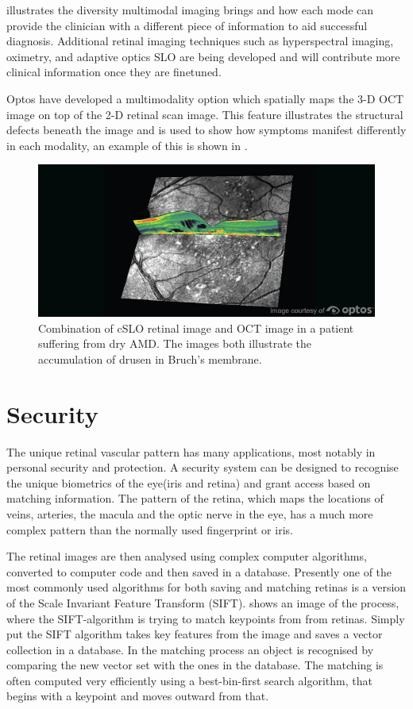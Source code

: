  illustrates the diversity multimodal imaging brings and how each mode
can provide the clinician with a different piece of information to aid successful
diagnosis. Additional retinal imaging techniques such as hyperspectral imaging,
oximetry, and adaptive optics SLO are being developed and will contribute more
clinical information once they are finetuned.

Optos have developed a multimodality option which spatially maps the 3-D OCT
image on top of the 2-D retinal scan image. This feature illustrates the structural
defects beneath the image and is used to show how symptoms manifest differently in
each modality, an example of this is shown in .

\begin{figure}[htbp]
\centering
 \includegraphics{figures/multi}
\caption{Combination of cSLO retinal image and OCT image in a patient suffering from
dry AMD. The images both illustrate the accumulation of drusen in Bruch’s membrane.}
\label{fig:multi}
\end{figure}

\section{Security}


The unique retinal vascular pattern has many applications, most notably in personal
security and protection. A security system can be designed to recognise the unique
biometrics of the eye(iris and retina) and grant access based on matching information.
The pattern of the retina, which maps the locations of veins, arteries, the macula
and the optic nerve in the eye, has a much more complex pattern than the normally used fingerprint or iris.\cite{ortega_2009}


The retinal images are then analysed using complex computer algorithms, converted to
computer code and then saved in a database. Presently one of the most commonly used
algorithms for both saving and matching retinas is a version of the Scale Invariant
Feature Transform (SIFT).  shows an image of the process, where the
SIFT-algorithm is trying to match keypoints from from retinas. Simply put the SIFT
algorithm takes key features from the image and saves a vector collection in a database.
In the matching process an object is recognised by comparing the new vector set with
the ones in the database. The matching is often computed very efficiently using a
best-bin-first search algorithm, that begins with a keypoint and moves outward from that.

